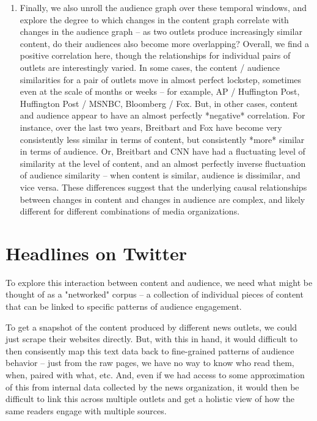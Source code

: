 \documentclass{scrartcl}
\begin{document}
\begin{enumerate}
\item Finally, we also unroll the audience graph over these temporal windows, and explore the degree to which changes in the content graph correlate with changes in the audience graph -- as two outlets produce increasingly similar content, do their audiences also become more overlapping? Overall, we find a positive correlation here, though the relationships for individual pairs of outlets are interestingly varied. In some cases, the content / audience similarities for a pair of outlets move in almost perfect lockstep, sometimes even at the scale of months or weeks -- for example, AP / Huffington Post, Huffington Post / MSNBC, Bloomberg / Fox. But, in other cases, content and audience appear to have an almost perfectly *negative* correlation. For instance, over the last two years, Breitbart and Fox have become very consistently less similar in terms of content, but consistently *more* similar in terms of audience. Or, Breitbart and CNN have had a fluctuating level of similarity at the level of content, and an almost perfectly inverse fluctuation of audience similarity -- when content is similar, audience is dissimilar, and vice versa. These differences suggest that the underlying causal relationships between changes in content and changes in audience are complex, and likely different for different combinations of media organizations.

\end{enumerate}

\section{Headlines on Twitter}

To explore this interaction between content and audience, we need what might be thought of as a "networked" corpus -- a collection of individual pieces of content that can be linked to specific patterns of audience engagement.

To get a snapshot of the content produced by different news outlets, we could just scrape their websites directly. But, with this in hand, it would difficult to then consisently map this text data back to fine-grained patterns of audience behavior -- just from the raw pages, we have no way to know who read them, when, paired with what, etc. And, even if we had access to some approximation of this from internal data collected by the news organization, it would then be difficult to link this across multiple outlets and get a holistic view of how the same readers engage with multiple sources.
\end{document}
